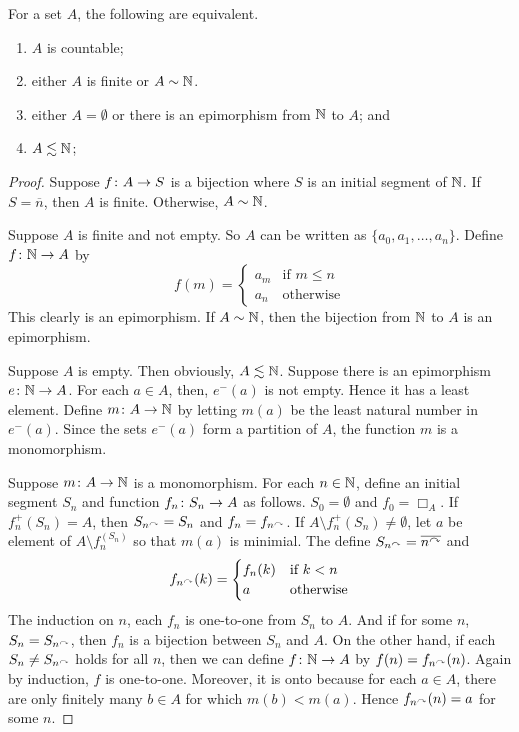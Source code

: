 \begin{theorem}
	For a set $A$, the following are equivalent.
	\begin{enumerate}
		\item $A$ is countable;
		\item either $A$ is finite or $A\sim \mathbb N$. 
		\item either $A=\emptyset$ or there is an epimorphism from $\mathbb N$ to $A$; and
		\item $A\lesssim\mathbb N$;
	\end{enumerate}
	
	\begin{proof}
		Suppose ${f}\colon{A}\to{S}$ is a bijection where $S$ is an initial segment of $\mathbb N$. If $S=\overline n$, then $A$ is finite. Otherwise, $A\sim \mathbb N$.
		
		Suppose $A$ is finite and not empty. So $A$ can be written as $\{a_0,a_1,\ldots,a_n\}$. Define ${f}\colon{\mathbb N}\to{A}$ by 
		\[f(m) = \begin{cases}
		 a_m&\text{if $m\leq n$}\\
		 a_n&\text{otherwise}
		\end{cases}
		\]
		This clearly is an epimorphism. If $A\sim\mathbb N$, then the bijection from $\mathbb N$ to $A$ is an epimorphism.
		
		Suppose $A$ is empty. Then obviously, $A\lesssim \mathbb N$. 
		Suppose there is an epimorphism ${e}\colon{\mathbb N}\to{A}$. 
		For each $a\in A$, then, $e^-(a)$ is not empty. 
		Hence it has a least element. 
		Define ${m}\colon{A}\to{\mathbb N}$ by letting $m(a)$ be the least natural number in $e^-(a)$. 
		Since the sets $e^-(a)$ form a partition of $A$, the function $m$ is a monomorphism.
		
		Suppose ${m}\colon{A}\to{\mathbb N}$ is a monomorphism. 
		For each $n\in\mathbb N$, define an initial segment $S_n$ and function ${f_n}\colon{S_n}\to{A}$ as follows. $S_0=\emptyset$ and $f_0 = \Box_A$.
		If $f_n^+(S_n) = A$, then $S_{n^\curvearrowright}=S_n$ and $f_n = f_{n^\curvearrowright}$. If $A\setminus f_n^+(S_n)\neq \emptyset$, let $a$ be element of $A\setminus f_n^(S_n)$ so that $m(a)$ is minimial. The define $S_{n^\curvearrowright} = \overline{n^\curvearrowright}$ and
		\[f_{n^\curvearrowright}(k) = \begin{cases}
			f_n(k) &\text{if $k<n$}\\
			a      & \text{otherwise}
		\end{cases} 
		\]
		The induction on $n$, each $f_n$ is one-to-one from $S_n$ to $A$.
		And if for some $n$, $S_n = S_{n^\curvearrowright}$, then $f_n$ is a bijection between $S_n$ and $A$. 
		On the other hand, if each $S_n\neq S_{n^\curvearrowright}$ holds for all $n$, then we can define ${f}\colon{\mathbb N}\to{A}$ by $f(n) = f_{n^\curvearrowright}(n)$. 
		Again by induction, $f$ is one-to-one. 
		Moreover, it is onto because for each $a\in A$, there are only finitely many $b\in A$ for which $m(b)<m(a)$. Hence $f_{n^\curvearrowright}(n) = a$ for some $n$. 
	\end{proof}
\end{theorem}

